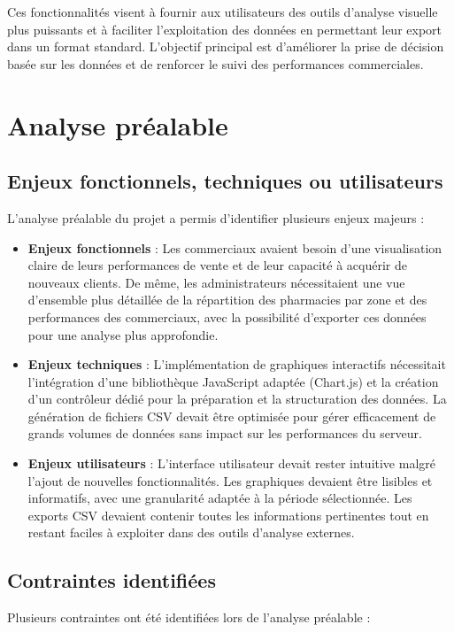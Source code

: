 \documentclass[a4paper,12pt]{report}
\begin{document}
  Ces fonctionnalités visent à fournir aux utilisateurs des outils d'analyse visuelle plus puissants et à faciliter l'exploitation des données en permettant leur export dans un format standard. L'objectif principal est d'améliorer la prise de décision basée sur les données et de renforcer le suivi des performances commerciales.

\newpage 
\section{Analyse préalable}
  \subsection{Enjeux fonctionnels, techniques ou utilisateurs}
  L'analyse préalable du projet a permis d'identifier plusieurs enjeux majeurs :
  
  \begin{itemize}
    \item \textbf{Enjeux fonctionnels} : Les commerciaux avaient besoin d'une visualisation claire de leurs performances de vente et de leur capacité à acquérir de nouveaux clients. De même, les administrateurs nécessitaient une vue d'ensemble plus détaillée de la répartition des pharmacies par zone et des performances des commerciaux, avec la possibilité d'exporter ces données pour une analyse plus approfondie.
    
    \item \textbf{Enjeux techniques} : L'implémentation de graphiques interactifs nécessitait l'intégration d'une bibliothèque JavaScript adaptée (Chart.js) et la création d'un contrôleur dédié pour la préparation et la structuration des données. La génération de fichiers CSV devait être optimisée pour gérer efficacement de grands volumes de données sans impact sur les performances du serveur.
    
    \item \textbf{Enjeux utilisateurs} : L'interface utilisateur devait rester intuitive malgré l'ajout de nouvelles fonctionnalités. Les graphiques devaient être lisibles et informatifs, avec une granularité adaptée à la période sélectionnée. Les exports CSV devaient contenir toutes les informations pertinentes tout en restant faciles à exploiter dans des outils d'analyse externes.
  \end{itemize}

  \subsection{Contraintes identifiées}
  Plusieurs contraintes ont été identifiées lors de l'analyse préalable :
  
\end{document}
